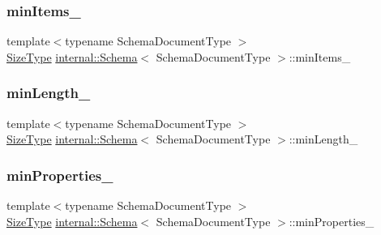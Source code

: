 \mbox{\label{classinternal_1_1Schema_a3e435762d5a3ef4696782c25c43c127d}} 
\subsubsection{\texorpdfstring{min\+Items\+\_\+}{minItems\_}}
{\footnotesize\ttfamily template$<$typename Schema\+Document\+Type $>$ \\
\hyperlink{rapidjson_8h_a5ed6e6e67250fadbd041127e6386dcb5}{Size\+Type} \hyperlink{classinternal_1_1Schema}{internal\+::\+Schema}$<$ Schema\+Document\+Type $>$\+::min\+Items\+\_\+\hspace{0.3cm}{\ttfamily [private]}}

\mbox{\label{classinternal_1_1Schema_ab8d01cad4b23cc422c312c31683a9500}} 
\subsubsection{\texorpdfstring{min\+Length\+\_\+}{minLength\_}}
{\footnotesize\ttfamily template$<$typename Schema\+Document\+Type $>$ \\
\hyperlink{rapidjson_8h_a5ed6e6e67250fadbd041127e6386dcb5}{Size\+Type} \hyperlink{classinternal_1_1Schema}{internal\+::\+Schema}$<$ Schema\+Document\+Type $>$\+::min\+Length\+\_\+\hspace{0.3cm}{\ttfamily [private]}}

\mbox{\label{classinternal_1_1Schema_aafacefd65ac029a9be75fd0e4df8f6f4}} 
\subsubsection{\texorpdfstring{min\+Properties\+\_\+}{minProperties\_}}
{\footnotesize\ttfamily template$<$typename Schema\+Document\+Type $>$ \\
\hyperlink{rapidjson_8h_a5ed6e6e67250fadbd041127e6386dcb5}{Size\+Type} \hyperlink{classinternal_1_1Schema}{internal\+::\+Schema}$<$ Schema\+Document\+Type $>$\+::min\+Properties\+\_\+\hspace{0.3cm}{\ttfamily [private]}}

